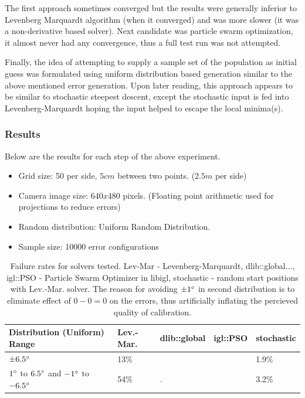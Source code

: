 \documentclass[english, printversion, nomenclature, notitle]{tuvisionthesis} %
\begin{document}
The first approach sometimes converged but the results were generally inferior to Levenberg Marquardt algorithm (when it converged) and was more slower (it was a non-derivative based solver). Next candidate was particle swarm optimization, it almost never had any convergence, thus a full test run was not attempted.

Finally, the idea of attempting to supply a sample set of the population as initial guess was formulated using uniform distribution based generation similar to the above mentioned error generation. Upon later reading, this approach appears to be similar to stochastic steepest descent, except the stochastic input is fed into Levenberg-Marquardt hoping the input helped to escape the local minima(s). 

\subsubsection{Results}

Below are the results for each step of the above experiment.  

\begin{itemize}
	\item Grid size: 50 per side, $5cm$ between two points. ($2.5m$ per side)
	\item Camera image size: $640 x 480$ pixels. (Floating point arithmetic used for projections to reduce errors)
	\item Random distribution: Uniform Random Distribution.
	\item Sample size: 10000 error configurations
\end{itemize}

\begin{table}[]
	\begin{tabular}{|l|l|l|l|l|}
		\hline
	Distribution (Uniform) Range & Lev.-Mar.  & dlib::global & igl::PSO & stochastic \\
	\hline
	$\pm6.5\degree$& 13\% &  &  & 1.9\% \\
	$1\degree$ to $6.5\degree$ and $-1\degree$ to $-6.5\degree$	& 54\% & . &  &3.2\% \\ \hline

	\end{tabular}
\caption{Failure rates for solvers tested. Lev-Mar - Levenberg-Marquardt, dlib::global..., igl::PSO - Particle Swarm Optimizer in libigl, stochastic - random start positions with Lev.-Mar. solver. The reason for avoiding $\pm1\degree$ in second distribution is to eliminate effect of $0 - 0 = 0$ on the errors, thus artificially inflating the percieved quality of calibration.}
\end{table}
\end{document}
